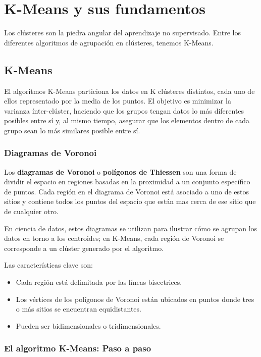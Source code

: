 \chapter{K-Means y sus fundamentos}
Los clústeres son la piedra angular del aprendizaje no supervisado. Entre los diferentes algoritmos de agrupación en clústeres, tenemos K-Means.

\section{K-Means}

El algoritmos K-Means particiona los datos en K clústeres distintos, cada uno de ellos representado por la media de los puntos. El objetivo es minimizar la varianza ínter-clúster, haciendo que los grupos tengan datos lo más diferentes posibles entre sí y, al mismo tiempo, asegurar que los elementos dentro de cada grupo sean lo más similares posible entre sí.

\subsection{Diagramas de Voronoi}

Los \textbf{diagramas de Voronoi} o \textbf{polígonos de Thiessen} son una forma de dividir el espacio en regiones basadas en la proximidad a un conjunto específico de puntos. Cada región en el diagrama de Voronoi está asociado a uno de estos sitios y contiene todos los puntos del espacio que están mas cerca de ese sitio que de cualquier otro.

En ciencia de datos, estos diagramas se utilizan para ilustrar cómo se agrupan los datos en torno a los centroides; en K-Means, cada región de Voronoi se corresponde a un clúster generado por el algoritmo.

Las características clave son:

\begin{itemize}
    \item Cada región está delimitada por las líneas bisectrices.

    \item Los vértices de los polígonos de Voronoi están ubicados en puntos donde tres o más sitios se encuentran equidistantes.

    \item Pueden ser bidimensionales o tridimensionales.
\end{itemize}


\subsection{El algoritmo K-Means: Paso a paso}

